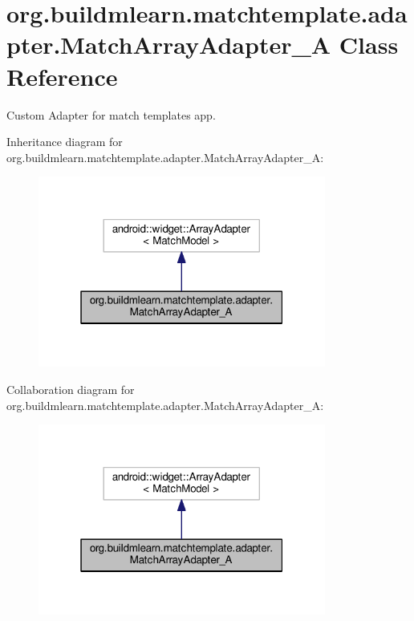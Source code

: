 \hypertarget{classorg_1_1buildmlearn_1_1matchtemplate_1_1adapter_1_1MatchArrayAdapter__A}{}\section{org.\+buildmlearn.\+matchtemplate.\+adapter.\+Match\+Array\+Adapter\+\_\+A Class Reference}
\label{classorg_1_1buildmlearn_1_1matchtemplate_1_1adapter_1_1MatchArrayAdapter__A}


Custom Adapter for match template\textquotesingle{}s app.  




Inheritance diagram for org.\+buildmlearn.\+matchtemplate.\+adapter.\+Match\+Array\+Adapter\+\_\+A\+:
\nopagebreak
\begin{figure}[H]
\begin{center}
\leavevmode
\includegraphics[width=268pt]{classorg_1_1buildmlearn_1_1matchtemplate_1_1adapter_1_1MatchArrayAdapter__A__inherit__graph}
\end{center}
\end{figure}


Collaboration diagram for org.\+buildmlearn.\+matchtemplate.\+adapter.\+Match\+Array\+Adapter\+\_\+A\+:
\nopagebreak
\begin{figure}[H]
\begin{center}
\leavevmode
\includegraphics[width=268pt]{classorg_1_1buildmlearn_1_1matchtemplate_1_1adapter_1_1MatchArrayAdapter__A__coll__graph}
\end{center}
\end{figure}
